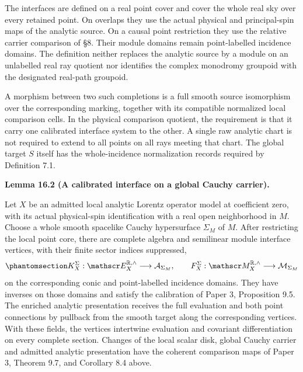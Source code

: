 \documentclass[
  english,
  11pt,
  reqno]{amsart}
\makeatletter
\newcommand{\pandocstatementheading}[1]{%
  \par\addpenalty{\@beginparpenalty}%
  \addvspace{.5\baselineskip plus .2\baselineskip minus .2\baselineskip}%
  {\normalfont\bfseries #1\par}%
  \nobreak\@afterindenttrue\@afterheading
}
\makeatother
\begin{document}
The interfaces are defined on a real point cover and cover the whole
real sky over every retained point. On overlaps they use the actual
physical and principal-spin maps of the analytic source. On a causal
point restriction they use the relative carrier comparison of §8. Their
module domains remain point-labelled incidence domains. The definition
neither replaces the analytic source by a module on an unlabelled real
ray quotient nor identifies the complex monodromy groupoid with the
designated real-path groupoid.

A morphism between two such completions is a full smooth source
isomorphism over the corresponding marking, together with its compatible
normalized local comparison cells. In the physical comparison quotient,
the requirement is that it carry one calibrated interface system to the
other. A single raw analytic chart is not required to extend to all
points on all rays meeting that chart. The global target \(S\) itself
has the whole-incidence normalization records required by Definition
7.1.

\pandocstatementheading{\protect{}\label{lem:analytic-local-global-carrier-interface}Lemma 16.2 (A calibrated interface on a global Cauchy carrier).}

Let \(X\) be an admitted local analytic Lorentz operator model at
coefficient zero, with its actual physical-spin identification with a
real open neighborhood in \(M\). Choose a whole smooth spacelike Cauchy
hypersurface \(\Sigma_M\) of \(M\). After restricting the local point
core, there are complete algebra and semilinear module interface
vertices, with their finite sector indices suppressed,
\begin{equation}\protect\phantomsection\label{eq:analytic-local-global-interface-vertices}{
K_X^\Sigma:\mathscr E_X^{\mathbb R,\wedge}
 \longrightarrow\mathcal A_{\Sigma_M},
\qquad
F_X^\Sigma:\mathscr M_X^{\mathbb R,\wedge}
 \longrightarrow\mathcal M_{\Sigma_M}
}\end{equation} on the corresponding conic and point-labelled incidence
domains. They have inverses on those domains and satisfy the calibration
of Paper 3, Proposition 9.5. The enriched analytic presentation receives
the full evaluation and both point connections by pullback from the
smooth target along the corresponding vertices. With these fields, the
vertices intertwine evaluation and covariant differentiation on every
complete section. Changes of the local scalar disk, global Cauchy
carrier and admitted analytic presentation have the coherent comparison
maps of Paper 3, Theorem 9.7, and Corollary 8.4 above.
\end{document}
